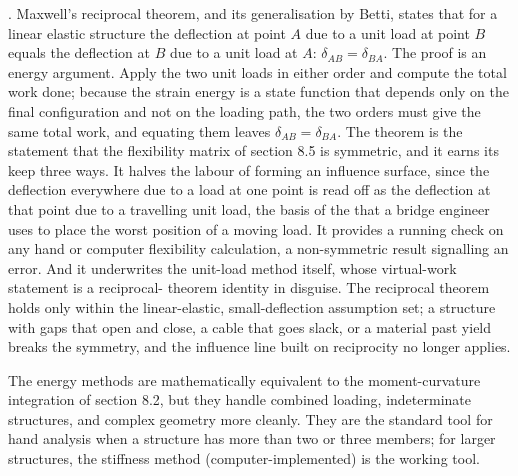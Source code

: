 . Maxwell's reciprocal theorem, and its
generalisation by Betti, states that for a linear elastic structure the
deflection at point $A$ due to a unit load at point $B$ equals the
deflection at $B$ due to a unit load at $A$: $\delta_{AB} = \delta_{BA}$.
The proof is an energy argument. Apply the two unit loads in either
order and compute the total work done; because the strain energy is a
state function that depends only on the final configuration and not on
the loading path, the two orders must give the same total work, and
equating them leaves $\delta_{AB} = \delta_{BA}$. The theorem is the
statement that the flexibility matrix of section 8.5 is symmetric, and
it earns its keep three ways. It halves the labour of forming an
influence surface, since the deflection everywhere due to a load at one
point is read off as the deflection at that point due to a travelling
unit load, the basis of the  that a bridge
engineer uses to place the worst position of a moving load. It provides
a running check on any hand or computer flexibility calculation, a
non-symmetric result signalling an error. And it underwrites the
unit-load method itself, whose virtual-work statement is a reciprocal-
theorem identity in disguise. The reciprocal theorem holds only within
the linear-elastic, small-deflection assumption set; a structure with
gaps that open and close, a cable that goes slack, or a material past
yield breaks the symmetry, and the influence line built on reciprocity
no longer applies.

The energy methods are mathematically equivalent to the
moment-curvature integration of section 8.2, but they handle
combined loading, indeterminate structures, and complex geometry
more cleanly. They are the standard tool for hand analysis when a
structure has more than two or three members; for larger structures,
the stiffness method (computer-implemented) is the working tool.

